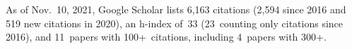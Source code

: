 %
As of Nov.~10, 2021, Google Scholar lists
6,163 citations (2,594 since 2016 and 519 new citations in 2020),
an h-index of~33 (23~counting only citations since 2016),
and 11~papers with 100+~citations, including 4~papers with 300+.
